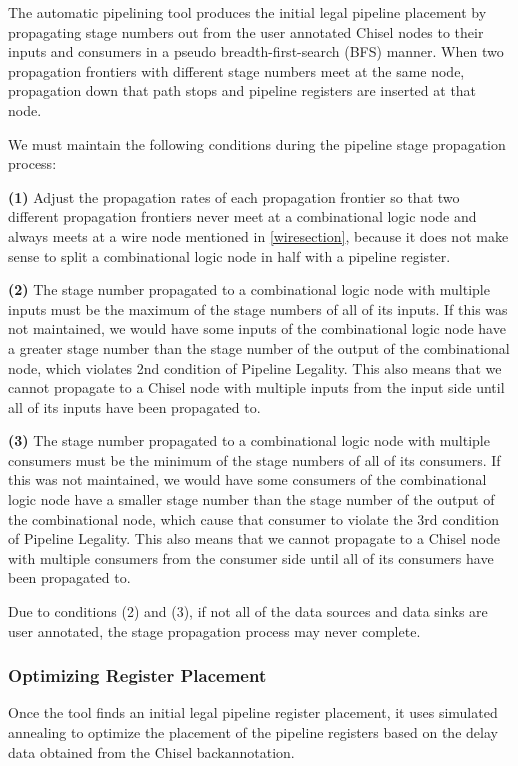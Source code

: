 The automatic pipelining tool produces the initial legal pipeline placement by propagating stage numbers out from the user annotated Chisel nodes to their inputs and consumers in a pseudo breadth-first-search (BFS) manner. When two propagation frontiers with different stage numbers meet at the same node, propagation down that path stops and pipeline registers are inserted at that node.

We must maintain the following conditions during the pipeline stage propagation process:

{\bf (1)} Adjust the propagation rates of each propagation frontier so that two different propagation frontiers never meet at a combinational logic node and always meets at a wire node mentioned in \ref{wiresection}, because it does not make sense to split a combinational logic node in half with a pipeline register.

{\bf (2)}  The stage number propagated to a combinational logic node with multiple inputs must be the maximum of the stage numbers of all of its inputs. If this was not maintained, we would have some inputs of the combinational logic node have a greater stage number than the stage number of the output of the combinational node, which violates 2nd condition of Pipeline Legality. This also means that we cannot propagate to a Chisel node with multiple inputs from the input side until all of its inputs have been propagated to.

{\bf (3)} The stage number propagated to a combinational logic node with multiple consumers must be the minimum of the stage numbers of all of its consumers. If this was not maintained, we would have some consumers of the combinational logic node have a smaller stage number than the stage number of the output of the combinational node, which cause that consumer to violate the 3rd condition of Pipeline Legality. This also means that we cannot propagate to a Chisel node with multiple consumers from the consumer side until all of its consumers have been propagated to.

Due to conditions (2) and (3), if not all of the data sources and data sinks are user annotated, the stage propagation process may never complete.
\subsubsection{Optimizing Register Placement}
Once the tool finds an initial legal pipeline register placement, it uses simulated annealing to optimize the placement of the pipeline registers based on the delay data obtained from the Chisel backannotation.

